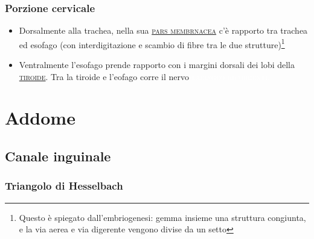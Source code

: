 \documentclass[italian,]{article}
\providecommand{\tightlist}{%
  \setlength{\itemsep}{0pt}\setlength{\parskip}{0pt}}
\newcommand{\ner}[1]{\colorbox{Dandelion}{\textcolor{white}{\textsc{#1}}}}
\renewcommand{\a}[1]{\underline{\textsc{#1}}}
\begin{document}
\hypertarget{porzione-cervicale}{%
\subsubsection{Porzione cervicale}\label{porzione-cervicale}}

\begin{itemize}
\tightlist
\item
  Dorsalmente alla trachea, nella sua \a{pars membrnacea} c'è rapporto
  tra trachea ed esofago (con interdigitazione e scambio di fibre tra le
  due strutture)\footnote{Questo è spiegato dall'embriogenesi: gemma
    insieme una struttura congiunta, e la via aerea e via digerente
    vengono divise da un setto}
\item
  Ventralmente l'esofago prende rapporto con i margini dorsali dei lobi
  della \a{tiroide}. Tra la tiroide e l'eofago corre il nervo
  \ner{laringeo ricorrente}
\end{itemize}

\hypertarget{addome}{%
\section{Addome}\label{addome}}

\hypertarget{canale-inguinale}{%
\subsection{Canale inguinale}\label{canale-inguinale}}

\hypertarget{triangolo-di-hesselbach}{%
\subsubsection{Triangolo di Hesselbach}\label{triangolo-di-hesselbach}}
\end{document}
